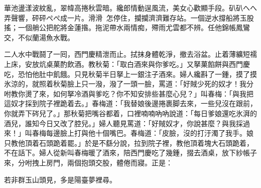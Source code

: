\begin{myquote}
華池盪漾波紋亂，翠幃高捲秋雲暗。纔郎情動逞風流，美女心歡顯手段。𥐙𥐙へへ弄聲響，砰砰ぺぺ成一片。滑滑𣺥𣺥怎停住，攔攔濟濟難存站。一個逆水撐船將玉股搖；一個艄公把舵將金蓮揝。拖泥帶水兩情痴，殢雨尤雲都不辨。任他錦帳鳳鸞交，不似蘭湯魚水戰。
\end{myquote}

二人水中戰鬪了一囘，西門慶精泄而止。拭抹身體乾淨，撤去浴盆。止着薄纊短襦上床，安放炕桌菓酌飲酒。教秋菊：「取白酒來與你爹吃。」又拏菓餡餅與西門慶吃，恐怕他肚中飢餓。只見秋菊半日拏上一銀注子酒來。婦人纔斟了一鍾，摸了摸氷涼的，就照着秋菊臉上只一潑，潑了一頭一臉，罵道：「好賊少死的奴才！我分咐教你燙了來，如何拏冷酒與爹吃？你不知安排些甚麼心兒？」叫春梅：「與我把這奴才採到院子裡跪着去。」春梅道：「我替娘後邊捲裹脚去來，一些兒沒在跟前，你就弄下硶兒了。」那秋菊把嘴谷都着，口裡喃喃吶吶說道：「每日爹娘還吃氷湃的酒兒，誰知今日又改了腔兒。」婦人聽見罵道：「好賊奴才，你說甚麼？與我採過來！」叫春梅每邊臉上打與他十個嘴巴。春梅道：「皮臉，沒的打汙濁了我手。娘只教他頂着石頭跪着罷。」於是不繇分說，拉到院子裡，教他頂着塊大石頭跪着，不在話下。婦人從新叫春梅暖了酒來，陪西門慶吃了幾鍾，掇去酒桌，放下紗帳子來，分咐拽上房門，兩個抱頭交股，體倦而寢。正是：

若非群玉山頭見，多是陽臺夢裡尋。

